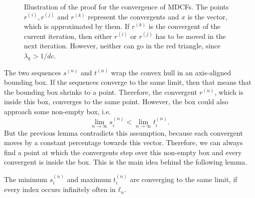 \begin{figure}[tbp]
  \centering
  
  \caption{
    Illustration of the proof for the convergence of MDCFs.
    The points $r^{(i)}, r^{(j)}$ and $r^{(k)}$ represent the convergents and $x$ is
    the vector, which is approximated by them.
    If $r^{(k)}$ is the convergent of the current iteration,
    then either $r^{(i)}$ or $r^{(j)}$ has to be moved in the next iteration.
    However, neither can go in the red triangle,
    since $λ_k > 1/dc$.
  }
  \label{fig:convergence}
\end{figure}

The two sequences $s^{(n)}$ and $t^{(n)}$ wrap the convex hull in an
axis-aligned bounding box.
If the sequences converge to the same limit,
then that means that the bounding box shrinks to a point.
Therefore, the convergent $r^{(n)}$, which is inside this box, converges to the
same point.
However, the box could also approach some non-empty box, i.e.
\[
  \lim_{n → ∞} s_i^{(n)} < \lim_{n → ∞} t_i^{(n)}.
\]
But the previous lemma contradicts this assumption,
because each convergent moves by a constant percentage towards this vector.
Therefore, we can always find a point at which the convergents step over this
non-empty box and every convergent is inside the box.
This is the main idea behind the following lemma.

\begin{lemma}
  \label{lem:min-max-conv}
  The minimum $s_i^{(n)}$ and maximum $t_i^{(n)}$ are converging to the same
  limit, if every index occurs infinitely often in $ℓ_n$.
\end{lemma}

